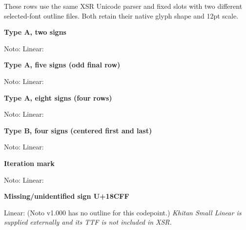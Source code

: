 \newpage
{}
These rows use the same XSR Unicode parser and fixed slots with two different
selected-font outline files. Both retain their native glyph shape and 12pt scale.
\par\bigskip
\textbf{Type A, two signs}\par
Noto:\qquad
Linear:\par\bigskip
\textbf{Type A, five signs (odd final row)}\par
Noto:\qquad
Linear:\par\bigskip
\textbf{Type A, eight signs (four rows)}\par
Noto:\qquad
Linear:\par\bigskip
\textbf{Type B, four signs (centered first and last)}\par
Noto:\qquad
Linear:\par\bigskip
\textbf{Iteration mark}\par
Noto:\qquad
Linear:\par\bigskip
\textbf{Missing/unidentified sign U+18CFF}\par
Linear:\quad
(Noto v1.000 has no outline for this codepoint.)
\vfill
\textit{Khitan Small Linear is supplied externally and its TTF is not included in XSR.}